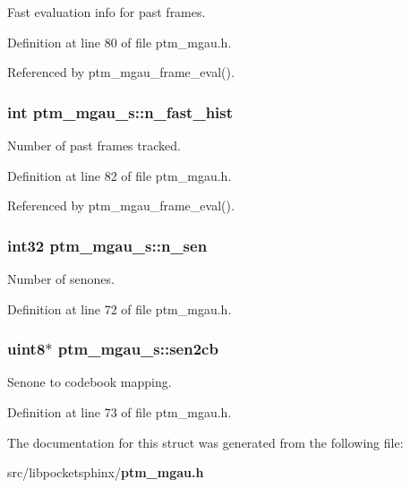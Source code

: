 Fast evaluation info for past frames. 



Definition at line 80 of file ptm\-\_\-mgau.\-h.



Referenced by ptm\-\_\-mgau\-\_\-frame\-\_\-eval().

\subsubsection[{n\-\_\-fast\-\_\-hist}]{\setlength{\rightskip}{0pt plus 5cm}int ptm\-\_\-mgau\-\_\-s\-::n\-\_\-fast\-\_\-hist}\label{structptm__mgau__s_ac491c223199ed5374dfb13fc41854601}


Number of past frames tracked. 



Definition at line 82 of file ptm\-\_\-mgau.\-h.



Referenced by ptm\-\_\-mgau\-\_\-frame\-\_\-eval().

\subsubsection[{n\-\_\-sen}]{\setlength{\rightskip}{0pt plus 5cm}int32 ptm\-\_\-mgau\-\_\-s\-::n\-\_\-sen}\label{structptm__mgau__s_ab0f6c452efe082383e906ac2a4f75de4}


Number of senones. 



Definition at line 72 of file ptm\-\_\-mgau.\-h.

\subsubsection[{sen2cb}]{\setlength{\rightskip}{0pt plus 5cm}uint8$\ast$ ptm\-\_\-mgau\-\_\-s\-::sen2cb}\label{structptm__mgau__s_a5e677255165b8abda63dd1d6dbed1be7}


Senone to codebook mapping. 



Definition at line 73 of file ptm\-\_\-mgau.\-h.



The documentation for this struct was generated from the following file\-:\begin{DoxyCompactItemize}
\item 
src/libpocketsphinx/{\bf ptm\-\_\-mgau.\-h}\end{DoxyCompactItemize}

